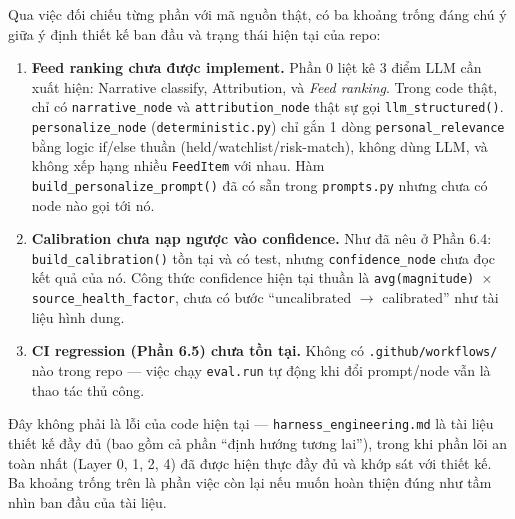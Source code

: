 \documentclass[12pt,a4paper]{article}
\newcommand{\file}[1]{\texttt{#1}}
\begin{document}
Qua việc đối chiếu từng phần với mã nguồn thật, có ba khoảng trống đáng chú ý giữa ý định thiết kế
ban đầu và trạng thái hiện tại của repo:

\begin{enumerate}[leftmargin=1.8em]
    \item \textbf{Feed ranking chưa được implement.} Phần 0 liệt kê 3 điểm LLM cần xuất hiện:
    Narrative classify, Attribution, và \emph{Feed ranking}. Trong code thật, chỉ có
    \texttt{narrative\_node} và \texttt{attribution\_node} thật sự gọi \texttt{llm\_structured()}.
    \texttt{personalize\_node} (\file{deterministic.py}) chỉ gắn 1 dòng \texttt{personal\_relevance}
    bằng logic if/else thuần (held/watchlist/risk-match), không dùng LLM, và không xếp hạng nhiều
    \texttt{FeedItem} với nhau. Hàm \texttt{build\_personalize\_prompt()} đã có sẵn trong
    \file{prompts.py} nhưng chưa có node nào gọi tới nó.
    \item \textbf{Calibration chưa nạp ngược vào confidence.} Như đã nêu ở Phần 6.4:
    \texttt{build\_calibration()} tồn tại và có test, nhưng \texttt{confidence\_node} chưa đọc kết
    quả của nó. Công thức confidence hiện tại thuần là \texttt{avg(magnitude) $\times$
    source\_health\_factor}, chưa có bước ``uncalibrated $\to$ calibrated'' như tài liệu hình
    dung.
    \item \textbf{CI regression (Phần 6.5) chưa tồn tại.} Không có \file{.github/workflows/} nào
    trong repo --- việc chạy \texttt{eval.run} tự động khi đổi prompt/node vẫn là thao tác thủ
    công.
\end{enumerate}

Đây không phải là lỗi của code hiện tại --- \file{harness\_engineering.md} là tài liệu thiết kế đầy
đủ (bao gồm cả phần ``định hướng tương lai''), trong khi phần lõi an toàn nhất (Layer 0, 1, 2, 4)
đã được hiện thực đầy đủ và khớp sát với thiết kế. Ba khoảng trống trên là phần việc còn lại nếu
muốn hoàn thiện đúng như tầm nhìn ban đầu của tài liệu.
\end{document}
